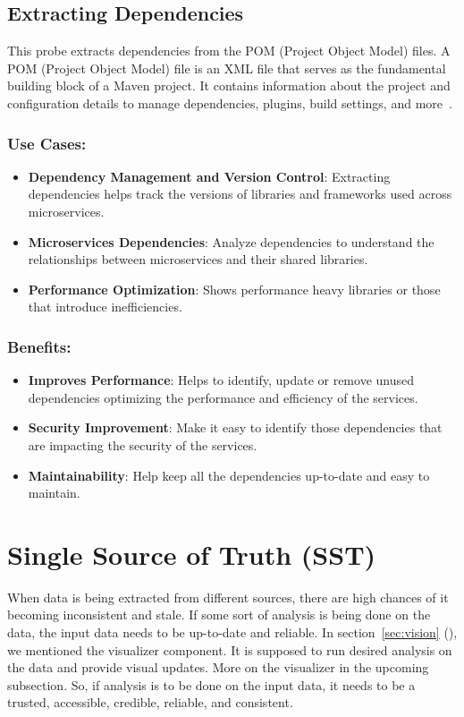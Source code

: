 \subsection{Extracting Dependencies}
This probe extracts dependencies from the POM (Project Object Model) files. A POM (Project Object Model) file is an XML file that serves as the fundamental building block of a Maven project. It contains information about the project and configuration details to manage dependencies, plugins, build settings, and more~\citep{pom_file_guide}.
\subsubsection{Use Cases:}
\begin{itemize}[label=$\bullet$]
	\item \textbf{Dependency Management and Version Control}: Extracting dependencies helps track the versions of libraries and frameworks used across microservices.
	\item \textbf{Microservices Dependencies}: Analyze dependencies to understand the relationships between microservices and their shared libraries.
	\item \textbf{Performance Optimization}: Shows performance heavy libraries or those that introduce inefficiencies.
\end{itemize}
\subsubsection{Benefits:}
\begin{itemize}[label=$\bullet$]
	\item \textbf{Improves Performance}: Helps to identify, update or remove unused dependencies optimizing the performance and efficiency of the services.
	\item \textbf{Security Improvement}: Make it easy to identify those dependencies that are impacting the security of the services.
	\item \textbf{Maintainability}: Help keep all the dependencies up-to-date and easy to maintain.
\end{itemize} 

\section{Single Source of Truth (SST)}\label{sec:component-sst}

When data is being extracted from different sources, there are high chances of it becoming inconsistent and stale. If some sort of analysis is being done on the data, the input data needs to be up-to-date and reliable. In section~\ref{sec:vision} (), we mentioned the visualizer component. It is supposed to run desired analysis on the data and provide visual updates. More on the visualizer in the upcoming subsection. So, if analysis is to be done on the input data, it needs to be a trusted, accessible, credible, reliable, and consistent.

